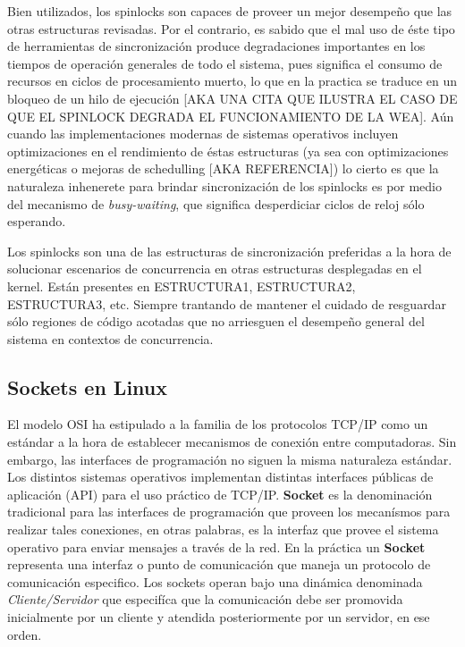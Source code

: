 Bien utilizados, los spinlocks son capaces de proveer un mejor desempeño que las otras estructuras revisadas. Por el contrario, es sabido que el mal uso de éste tipo de herramientas de sincronización produce degradaciones importantes en los tiempos de operación generales de todo el sistema, pues significa el consumo de recursos en ciclos de procesamiento muerto, lo que en la practica se traduce en un bloqueo de un hilo de ejecución [AKA UNA CITA QUE ILUSTRA EL CASO DE QUE EL SPINLOCK DEGRADA EL FUNCIONAMIENTO DE LA WEA]. Aún cuando las implementaciones modernas de sistemas operativos incluyen optimizaciones en el rendimiento de éstas estructuras (ya sea con optimizaciones energéticas o mejoras de schedulling [AKA REFERENCIA]) lo cierto es que la naturaleza inhenerete para brindar sincronización de los spinlocks es por medio del mecanismo de \emph{busy-waiting}, que significa desperdiciar ciclos de reloj sólo esperando.

Los spinlocks son una de las estructuras de sincronización preferidas a la hora de solucionar escenarios de concurrencia en otras estructuras desplegadas en el kernel. Están presentes en ESTRUCTURA1, ESTRUCTURA2, ESTRUCTURA3, etc. Siempre trantando de mantener el cuidado de resguardar sólo regiones de código acotadas que no arriesguen el desempeño general del sistema en contextos de concurrencia.

\subsection{Sockets en Linux}
El modelo OSI ha estipulado a la familia de los protocolos TCP/IP como un estándar a la hora de establecer mecanismos de conexión entre computadoras. Sin embargo, las interfaces de programación no siguen la misma naturaleza estándar. Los distintos sistemas operativos implementan distintas interfaces públicas de aplicación (API) para el uso práctico de TCP/IP. \textbf{Socket} es la denominación tradicional para las interfaces de programación que proveen los mecanísmos para realizar tales conexiones, en otras palabras, es la interfaz que provee el sistema operativo para enviar mensajes a través de la red. En la práctica un \textbf{Socket} representa una interfaz o punto de comunicación que maneja un protocolo de comunicación especifico. Los sockets operan bajo una dinámica denominada \emph{Cliente/Servidor} que especifíca que la comunicación debe ser promovida inicialmente por un cliente y atendida posteriormente por un servidor, en ese orden.

